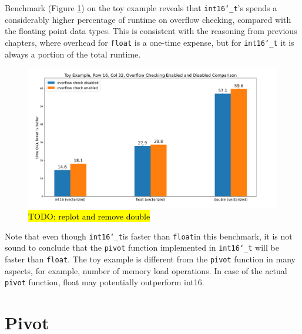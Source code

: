 \documentclass[logo,bsc,singlespacing,parskip]{infthesis}
\newcommand{\dtshort}{\texttt{int16\char`_t}}
\newcommand{\dtfloat}{\texttt{float}}
\newcommand{\pivot}{\texttt{pivot}}
\begin{document}

Benchmark (Figure \ref{fig:i16-f32}) on the toy example reveals that \dtshort{}'s
spends a considerably higher percentage of runtime on overflow checking,
compared with the floating point data types. This is consistent with the
reasoning from previous chapters, where overhead for \dtfloat{} is a one-time
expense, but for \dtshort{} it is always a portion of the total runtime. 

\begin{figure}
    \includegraphics[width=\linewidth]{image/i16-f32.png}
    \caption{\hl{TODO: replot and remove double}}
    \label{fig:i16-f32}
\end{figure}

Note that even though \dtshort is faster than \dtfloat in this benchmark, it is
not sound to conclude that the \pivot{} function implemented in \dtshort
will be faster than \dtfloat. The toy example is different from the \pivot
function in many aspects, for example, number of memory load operations. In case
of the actual \pivot{} function, float may potentially outperform int16. 




\chapter{Pivot}
\end{document}
